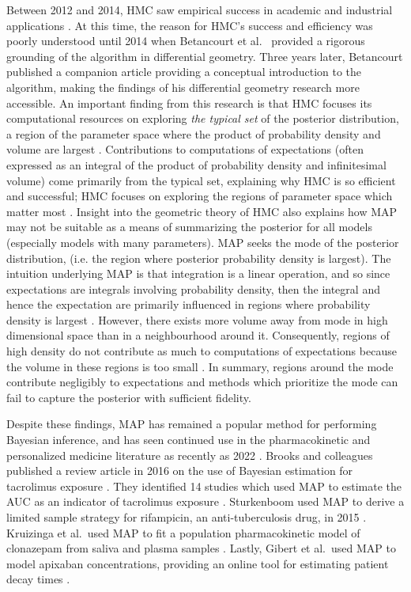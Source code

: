 Between 2012 and 2014, HMC saw empirical success in academic and industrial applications  \cite{betancourt2014geometric, Carpenter2017-qf}.  At this time, the reason for HMC's success and efficiency was poorly understood until 2014 when  Betancourt et al.\ \cite{betancourt2014geometric} provided a rigorous grounding of the algorithm in differential geometry.  Three years later, Betancourt published a companion article \cite{Betancourt2017-ak} providing a conceptual introduction to the algorithm, making the findings of his differential geometry research more accessible. An important finding from this research is that HMC focuses its computational resources on exploring \textit{the typical set} of the posterior distribution, a region of the parameter space where the product of probability density and volume are largest \cite{Betancourt2017-ak}.  Contributions to computations of expectations  (often expressed as an integral of the product of probability density and infinitesimal volume) come primarily from the typical set, explaining why HMC is so efficient and successful; HMC focuses on exploring the regions of parameter space which matter most \cite{Betancourt2017-ak}.  Insight into the geometric theory of HMC also explains how MAP may not be suitable as a means of summarizing the posterior for all models (especially models with many parameters).  MAP seeks the mode of the posterior distribution, (i.e. the region where posterior probability density is largest).  The intuition underlying MAP is that integration is a linear operation, and so since expectations are integrals involving probability density, then the integral and hence the expectation are primarily influenced in regions where probability density is largest \cite{Betancourt2017-ak}.  However, there exists more volume away from mode in high dimensional space than in a  neighbourhood around it.  Consequently, regions of high density do not contribute as much to computations of expectations because the volume in these regions is too small \cite{Betancourt2017-ak}.  In summary, regions around the mode contribute negligibly to expectations and methods which prioritize the mode can fail to capture the posterior with sufficient fidelity.

Despite these findings, MAP has remained a popular method for performing Bayesian inference, and has seen continued use in the pharmacokinetic and personalized medicine literature as recently as 2022 \cite{gibert2022development}.  Brooks and colleagues published a review article in 2016 on the use of Bayesian estimation for tacrolimus exposure \cite{Brooks2016-li}.  They identified 14 studies which used MAP to estimate the AUC as an indicator of tacrolimus exposure \cite{Brooks2016-li}.  Sturkenboom used MAP to derive a limited sample strategy for rifampicin, an anti-tuberculosis drug, in 2015 \cite{sturkenboom2021population, sturkenboom2015pharmacokinetic}. Kruizinga et al.\ used MAP to fit a population pharmacokinetic model of clonazepam from saliva and plasma samples \cite{kruizinga2022population}.  Lastly, Gibert et al.\ used MAP to model apixaban concentrations, providing an online tool for estimating patient decay times \cite{gibert2022development}.  

